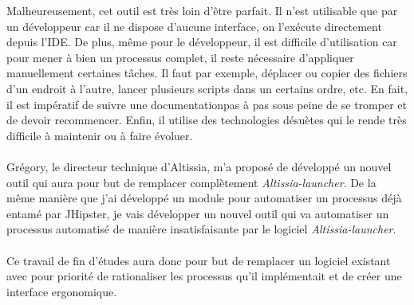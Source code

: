 Malheureusement, cet outil est très loin d'être parfait.
Il n'est utilisable que par un développeur car il ne dispose d'aucune interface, on l'exécute directement depuis l'IDE\fnmark.
De plus, même pour le développeur, il est difficile d'utilisation car pour mener à bien un processus complet, il reste nécessaire d'appliquer manuellement certaines tâches.
Il faut par exemple, déplacer ou copier des fichiers d'un endroit à l'autre, lancer plusieurs scripts dans un certains ordre, etc.
En fait, il est impératif de suivre une documentation\fnmark pas à pas sous peine de se tromper et de devoir recommencer.
Enfin, il utilise des technologies désuètes qui le rende très difficile à maintenir ou à faire évoluer.


\paragraph{}
Grégory, le directeur technique d'Altissia, m'a proposé de développé un nouvel outil qui aura pour but de remplacer complètement \textit{Altissia-launcher}.
De la même manière que j'ai développé un module pour automatiser un processus déjà entamé par JHipster,
je vais développer un nouvel outil qui va automatiser un processus automatisé de manière insatisfaisante par le logiciel \textit{Altissia-launcher}.

\paragraph{}
Ce travail de fin d'études aura donc pour but de remplacer un logiciel existant avec pour priorité de rationaliser les processus qu'il implémentait et de créer une interface ergonomique.
